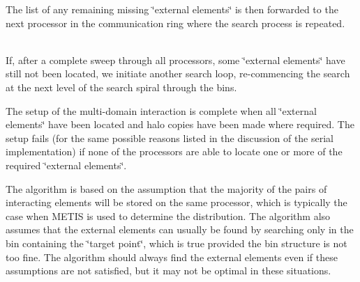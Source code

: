 \begin{DoxyEnumerate}
\item The list of any remaining missing \char`\"{}external elements\char`\"{} is then forwarded to the next processor in the communication ring where the search process is repeated. ~\newline
~\newline

\item If, after a complete sweep through all processors, some \char`\"{}external elements\char`\"{} have still not been located, we initiate another search loop, re-\/commencing the search at the next level of the search spiral through the bins. ~\newline
~\newline

\item The setup of the multi-\/domain interaction is complete when all \char`\"{}external elements\char`\"{} have been located and halo copies have been made where required. The setup fails (for the same possible reasons listed in the discussion of the serial implementation) if none of the processors are able to locate one or more of the required \char`\"{}external elements\char`\"{}.
\end{DoxyEnumerate}The algorithm is based on the assumption that the majority of the pairs of interacting elements will be stored on the same processor, which is typically the case when {\ttfamily M\+E\+T\+IS} is used to determine the distribution. The algorithm also assumes that the external elements can usually be found by searching only in the bin containing the \char`\"{}target
 point\char`\"{}, which is true provided the bin structure is not too fine. The algorithm should always find the external elements even if these assumptions are not satisfied, but it may not be optimal in these situations.



